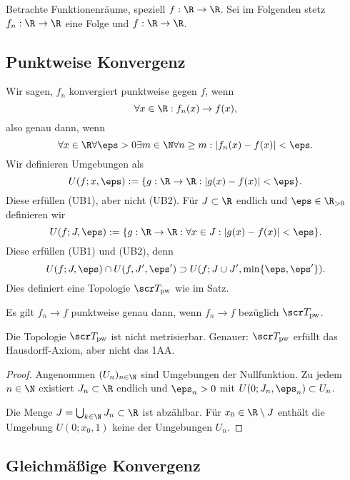 Betrachte Funktionenräume, speziell $f : \R \to \R$.
Sei im Folgenden stetz $f_n: \R \to \R$ eine Folge und $f: \R \to \R$.

\subsection{Punktweise Konvergenz}

Wir sagen, $f_n$ konvergiert punktweise gegen $f$, wenn
\[
	\forall x \in \R : f_n(x) \to f(x),
\]
also genau dann, wenn
\[
	\forall x \in \R \forall \eps > 0 \exists m \in \N \forall n \ge m : |f_n(x) - f(x)| < \eps.
\]
Wir definieren Umgebungen als
\[
	U(f; x, \eps)
	:= \{ g: \R \to \R : |g(x) - f(x)| < \eps \}.
\]
Diese erfüllen (UB1), aber nicht (UB2).
Für $J \subset \R$ endlich und $\eps \in \R_{>0}$ definieren wir
\[
	U(f; J, \eps)
	:= \{ g: \R \to \R : \forall x \in J : |g(x) - f(x)| < \eps \}.
\]
Diese erfüllen (UB1) und (UB2), denn
\[
	U(f; J, \eps) \cap U(f, J', \eps')
	\supset U(f; J \cup J', \min\{\eps, \eps'\}).
\]
Dies definiert eine Topologie $\scr T_{\text{pw}}$ wie im Satz. %

Es gilt $f_n \to f$ punktweise genau dann, wenn $f_n \to f$ bezüglich $\scr T_{\text{pw}}$.

\begin{st}
	Die Topologie $\scr T_{\text{pw}}$ ist nicht metrisierbar.
	Genauer: $\scr T_{\text{pw}}$ erfüllt das Hausdorff-Axiom, aber nicht das 1AA.
	\begin{proof}
		Angenommen $(U_n)_{n\in\N}$ sind Umgebungen der Nullfunktion.
		Zu jedem $n \in \N$ existiert $J_n \subset \R$ endlich und $\eps_n > 0$ mit $U(0; J_n, \eps_n) \subset U_n$.

		Die Menge $J = \bigcup_{k\in\N} J_n \subset \R$ ist abzählbar.
		Für $x_0 \in \R \setminus J$ enthält die Umgebung $U(0; x_0, 1)$ keine der Umgebungen $U_n$.
	\end{proof}
\end{st}

\subsection{Gleichmäßige Konvergenz} %

